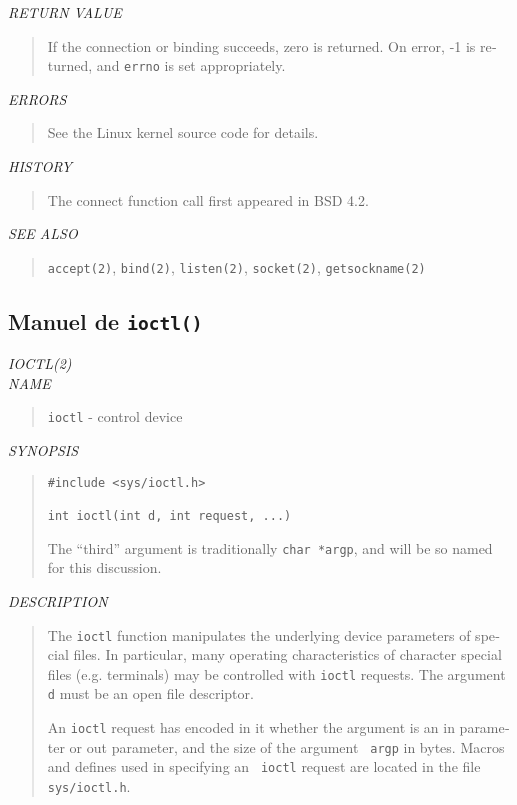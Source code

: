 \begin{appendix}
\begin{english}
{\sl RETURN VALUE}
\begin{quote}
	If the connection or binding succeeds, zero is returned.
	On error, -1 is returned, and {\tt errno} is set appropriately.
\end{quote}

{\sl ERRORS}
\begin{quote}
	See the Linux kernel source code for details.
\end{quote}

{\sl HISTORY}
\begin{quote}
	The connect function call first appeared in BSD 4.2.
\end{quote}

{\sl SEE ALSO}
\begin{quote}
	{\tt accept(2)}, {\tt bind(2)}, {\tt listen(2)}, {\tt socket(2)},
	{\tt getsockname(2)}
\end{quote}
\end{english}

\subsection{Manuel de {\tt ioctl()}}
\begin{english}
{\sl IOCTL(2)}\\

{\sl NAME}
\begin{quote}
	{\tt ioctl} - control device
\end{quote}

{\sl SYNOPSIS}
\begin{quote}
\begin{verbatim}
#include <sys/ioctl.h>

int ioctl(int d, int request, ...)
\end{verbatim}

The ``third'' argument is traditionally {\tt char *argp}, and
will be so named for this discussion.
\end{quote}

{\sl DESCRIPTION}
\begin{quote}
	The {\tt ioctl} function manipulates the underlying device
	parameters of special files. In particular, many operating
	characteristics of character special files (e.g. terminals) may be
	controlled with {\tt ioctl} requests. The argument {\tt d} must be
	an open file descriptor.

	An {\tt ioctl} request has encoded in it whether the argument is an 
	in parameter or out parameter, and the size of the argument {\tt
	argp} in bytes. Macros and defines used in specifying an {\tt
	ioctl} request are located in the file {\tt sys/ioctl.h}.
\end{quote}


\end{english}
\end{appendix}
